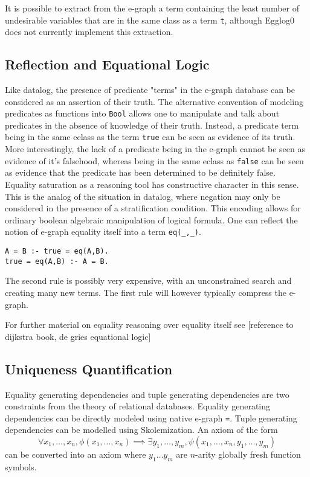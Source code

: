 \documentclass[sigplan,10pt,review,anonymous]{acmart}
\begin{document}
It is possible to extract from the e-graph a term containing the least number of undesirable variables that are in the same class as a term \lstinline{t}, although Egglog0 does not currently implement this extraction.

\subsection{Reflection and Equational Logic}
Like datalog, the presence of predicate "terms" in the e-graph database can be considered as an assertion of their truth. The alternative convention of modeling predicates as functions into \lstinline{Bool} allows one to manipulate and talk about predicates in the absence of knowledge of their truth. Instead, a predicate term being in the same eclass as the term \lstinline{true} can be seen as evidence of its truth. More interestingly, the lack of a predicate being in the e-graph cannot be seen as evidence of it's falsehood, whereas being in the same eclass as \lstinline{false} can be seen as evidence that the predicate has been determined to be definitely false.  Equality saturation as a reasoning tool has constructive character in this sense. This is the analog of the situation in datalog, where negation may only be considered in the presence of a stratification condition.
This encoding allows for ordinary boolean algebraic manipulation of logical formula.
One can reflect the notion of e-graph equality itself into a term \lstinline{eq(_,_)}.

\begin{lstlisting}
A = B :- true = eq(A,B).
true = eq(A,B) :- A = B.

\end{lstlisting}
The second rule is possibly very expensive, with an unconstrained search and creating many new terms. The first rule will however typically compress the e-graph.

For further material on equality reasoning over equality itself see [reference to dijkstra book, de gries equational logic]

\subsection{Uniqueness Quantification}
Equality generating dependencies and tuple generating dependencies are two constraints from the theory of relational databases.
Equality generating dependencies can be directly modeled using native e-graph \lstinline{=}.
Tuple generating dependencies can be modelled using Skolemization.
An axiom of the form $$ \forall x_1, \ldots, x_n, \phi(x_1, \ldots , x_n) \implies \exists y_1, \ldots, y_m,  \psi(x_1,\ldots,x_n, y_1,\ldots, y_m) $$
can be converted into an axiom where $y_1 \ldots y_m$ are $n$-arity globally fresh function symbols.
\end{document}
